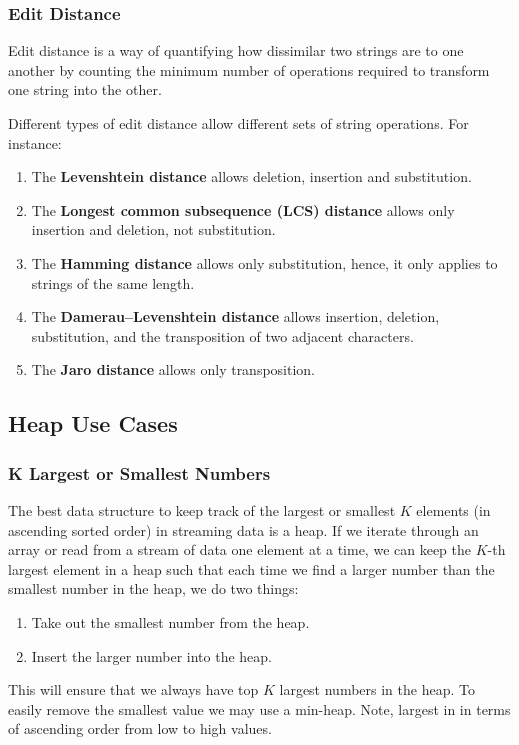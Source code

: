 \documentclass{article}
\begin{document}
    \subsubsection{Edit Distance}
    Edit distance is a way of quantifying how dissimilar two strings are to one another by counting the minimum number of operations required to transform one string into the other. 

    Different types of edit distance allow different sets of string operations. For instance:
    \begin{enumerate}
        \item The \textbf{Levenshtein distance} allows deletion, insertion and substitution.
        \item The \textbf{Longest common subsequence (LCS) distance} allows only insertion and deletion, not substitution.
        \item The \textbf{Hamming distance} allows only substitution, hence, it only applies to strings of the same length.
        \item The \textbf{Damerau–Levenshtein distance} allows insertion, deletion, substitution, and the transposition of two adjacent characters.
        \item The \textbf{Jaro distance} allows only transposition.
    \end{enumerate}
    
    \subsection{Heap Use Cases}
    \subsubsection{K Largest or Smallest Numbers}
    The best data structure to keep track of the largest or smallest $K$ elements (in ascending sorted order) in streaming data is a heap. If we iterate through an array or read from a stream of data one element at a time, we can keep the $K$-th largest element in a heap such that each time we find a larger number than the smallest number in the heap, we do two things:
    \begin{enumerate}
        \item Take out the smallest number from the heap.
        \item Insert the larger number into the heap.
    \end{enumerate}
    This will ensure that we always have top $K$ largest numbers in the heap. To easily remove the smallest value we may use a min-heap. Note, largest in in terms of ascending order from low to high values. 
    
\end{document}
